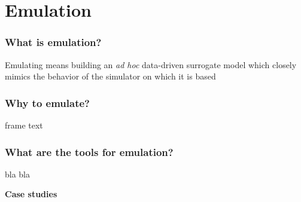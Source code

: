 \documentclass[xcolor=dvipsnames, USenglish]{beamer}  %
\begin{document}
\section{Emulation}
  \begin{frame}
    \frametitle{What is emulation?}
    Emulating means building an \emph{ad hoc} data-driven surrogate model which
    closely mimics the behavior of the simulator on which it is based

    \begin{figure}[b]
      \centering
        \hspace{.5cm}
    \end{figure}
    \centering
  \end{frame}


  \begin{frame}
    \frametitle{Why to emulate?}
    frame text
  \end{frame}


  \begin{frame}
    \frametitle{What are the tools for emulation?}
    bla bla
  \end{frame}


  {
  \begin{frame}[plain]
    \centering
    \Large{\textbf{Case studies}}\\
  \end{frame}
  }
\end{document}
